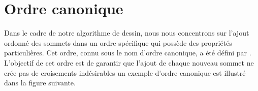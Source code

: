 \documentclass[hidelinks,letterpaper,12pt]{article}
\begin{document}

\newpage 
\section{Ordre canonique}
\label{Ordre canonique}
Dans le cadre de notre algorithme de dessin, nous nous concentrons sur l'ajout ordonné des sommets dans un ordre spécifique qui possède des propriétés particulières. Cet ordre, connu sous le nom d'ordre canonique, a été défini par \citep{FraysseixPachPollack}. L'objectif de cet ordre est de garantir que l'ajout de chaque nouveau sommet ne crée pas de croisements indésirables \citep[PartII]{PhilippKindermann} un exemple d'ordre canonique est illustré dans la figure suivante.
\end{document}
